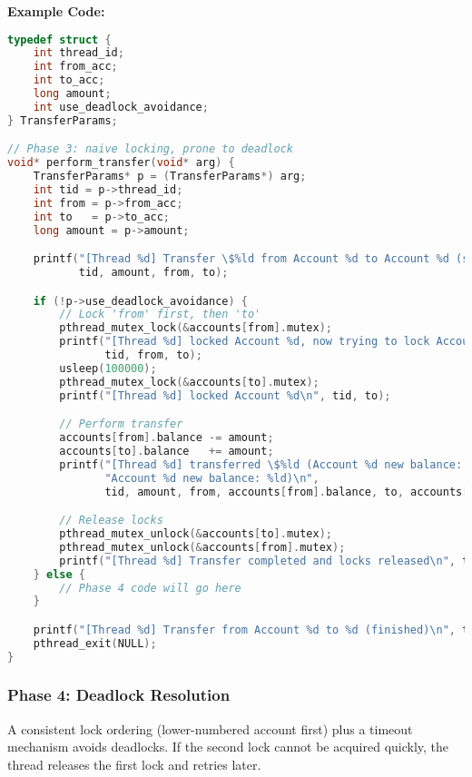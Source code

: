 \documentclass[11pt]{article}
\begin{document}
\textbf{Example Code:}
\begin{lstlisting}[language=C]
typedef struct {
    int thread_id;
    int from_acc;
    int to_acc;
    long amount;
    int use_deadlock_avoidance;
} TransferParams;

// Phase 3: naive locking, prone to deadlock
void* perform_transfer(void* arg) {
    TransferParams* p = (TransferParams*) arg;
    int tid = p->thread_id;
    int from = p->from_acc;
    int to   = p->to_acc;
    long amount = p->amount;

    printf("[Thread %d] Transfer \$%ld from Account %d to Account %d (starting)\n",
           tid, amount, from, to);

    if (!p->use_deadlock_avoidance) {
        // Lock 'from' first, then 'to'
        pthread_mutex_lock(&accounts[from].mutex);
        printf("[Thread %d] locked Account %d, now trying to lock Account %d\n",
               tid, from, to);
        usleep(100000);
        pthread_mutex_lock(&accounts[to].mutex);
        printf("[Thread %d] locked Account %d\n", tid, to);

        // Perform transfer
        accounts[from].balance -= amount;
        accounts[to].balance   += amount;
        printf("[Thread %d] transferred \$%ld (Account %d new balance: %ld, "
               "Account %d new balance: %ld)\n",
               tid, amount, from, accounts[from].balance, to, accounts[to].balance);

        // Release locks
        pthread_mutex_unlock(&accounts[to].mutex);
        pthread_mutex_unlock(&accounts[from].mutex);
        printf("[Thread %d] Transfer completed and locks released\n", tid);
    } else {
        // Phase 4 code will go here
    }

    printf("[Thread %d] Transfer from Account %d to %d (finished)\n", tid, from, to);
    pthread_exit(NULL);
}
\end{lstlisting}

\subsubsection{Phase 4: Deadlock Resolution}
A consistent lock ordering (lower-numbered account first) plus a timeout mechanism avoids deadlocks. If the second lock cannot be acquired quickly, the thread releases the first lock and retries later.
\end{document}
